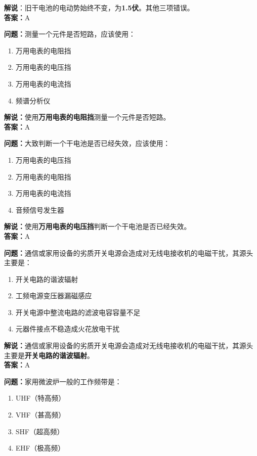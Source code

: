 \textbf{解说}：旧干电池的电动势始终不变，为\textbf{1.5伏}。其他三项错误。\\\textbf{答案：}A%


\textbf{问题：}测量一个元件是否短路，应该使用：

\begin{enumerate}[label=\Alph*), leftmargin=1.5cm]
	\item 万用电表的电阻挡
	\item 万用电表的电压挡
	\item 万用电表的电流挡
	\item 频谱分析仪
\end{enumerate}

\textbf{解说：}使用\textbf{万用电表的电阻挡}测量一个元件是否短路。\\\textbf{答案：}A%


\textbf{问题：}大致判断一个干电池是否已经失效，应该使用：

\begin{enumerate}[label=\Alph*), leftmargin=1.5cm]
	\item 万用电表的电压挡
	\item 万用电表的电阻挡
	\item 万用电表的电流挡
	\item 音频信号发生器
\end{enumerate}

\textbf{解说：}使用\textbf{万用电表的电压挡}判断一个干电池是否已经失效。\\\textbf{答案：}A%


\textbf{问题：}通信或家用设备的劣质开关电源会造成对无线电接收机的电磁干扰，其源头主要是：

\begin{enumerate}[label=\Alph*), leftmargin=1.5cm]
	\item 开关电路的谐波辐射
	\item 工频电源变压器漏磁感应
	\item 开关电源中整流电路的滤波电容容量不足
	\item 元器件接点不稳造成火花放电干扰
\end{enumerate}

\textbf{解说：}通信或家用设备的劣质开关电源会造成对无线电接收机的电磁干扰，其源头主要是\textbf{开关电路的谐波辐射}。\\\textbf{答案：}A%


\textbf{问题：}家用微波炉一般的工作频带是：

\begin{enumerate}[label=\Alph*), leftmargin=1.5cm]
	\item UHF（特高频）
	\item VHF（甚高频）
	\item SHF（超高频）
	\item EHF（极高频）
\end{enumerate}


